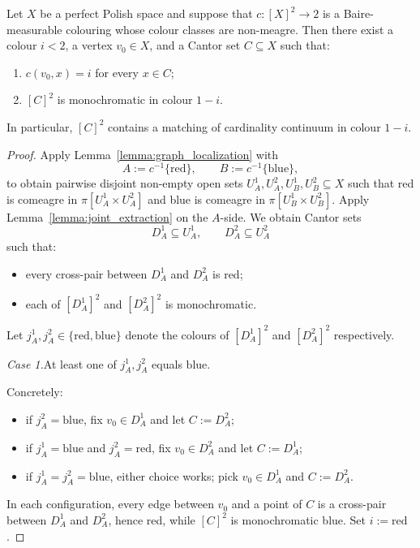 \begin{theorem}\label{thm:inf_const_bal}
    Let $X$ be a perfect Polish space and suppose that $c\colon[X]^2\to 2$ is a Baire-measurable colouring whose colour classes are non-meagre.
    Then there exist a colour $i<2$, a vertex $v_0\in X$, and a Cantor set $C\subseteq X$ such that:
    \begin{enumerate}[label=\textup{(\roman*)}]
        \item $c(v_0,x)=i$ for every $x\in C$;
        \item $[C]^2$ is monochromatic in colour $1-i$.
    \end{enumerate}
    In particular, $[C]^2$ contains a matching of cardinality continuum in colour $1-i$.
\end{theorem}
 
\begin{proof}
    Apply Lemma~\ref{lemma:graph_localization} with $$A:=c^{-1}\{\mathrm{red}\},\qquad B:=c^{-1}\{\mathrm{blue}\},$$ to obtain pairwise disjoint non-empty open sets $U_A^1,U_A^2,U_B^1,U_B^2\subseteq X$ such that red is comeagre in $\pi[U_A^1\times U_A^2]$ and blue is comeagre in $\pi[U_B^1\times U_B^2]$.
    Apply Lemma~\ref{lemma:joint_extraction} on the $A$-side.
    We obtain Cantor sets $$D_A^1\subseteq U_A^1,\qquad D_A^2\subseteq U_A^2$$ such that:
    \begin{itemize}
        \item every cross-pair between $D_A^1$ and $D_A^2$ is red;
        \item each of $[D_A^1]^2$ and $[D_A^2]^2$ is monochromatic.
    \end{itemize}
 
    Let $j_A^1,j_A^2\in\{\mathrm{red},\mathrm{blue}\}$ denote the colours of $[D_A^1]^2$ and $[D_A^2]^2$ respectively.
 
    \medskip\noindent\textit{Case 1.}\quad At least one of $j_A^1,j_A^2$ equals $\mathrm{blue}$.
    
    Concretely:
    \begin{itemize}
        \item if $j_A^2=\mathrm{blue}$, fix $v_0\in D_A^1$ and let $C:=D_A^2$;
        \item if $j_A^1=\mathrm{blue}$ and $j_A^2=\mathrm{red}$, fix $v_0\in D_A^2$ and let $C:=D_A^1$;
        \item if $j_A^1=j_A^2=\mathrm{blue}$, either choice works; pick $v_0\in D_A^1$ and $C:=D_A^2$.
    \end{itemize}
    In each configuration, every edge between $v_0$ and a point of $C$ is a cross-pair between $D_A^1$ and $D_A^2$, hence red, while $[C]^2$ is monochromatic blue.
    Set $i:=\mathrm{red}$.
 

\end{proof}
